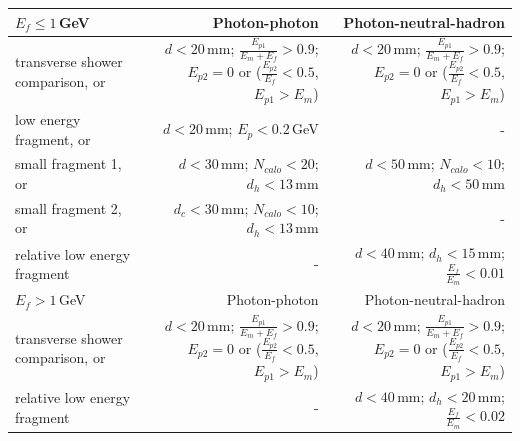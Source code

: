 \begin{table}[htbp]
\centering

\smallskip

\begin{tabular}{l  r  r }
\hline
\hline
$E_f\leqslant1$\,GeV &  Photon-photon & Photon-neutral-hadron \\
\hline
\multicolumn{1}{L{0.3\textwidth}}{transverse shower comparison, or} & \multicolumn{1}{R{0.3\textwidth}}{$d < 20 $\,mm; $\frac{E_{p1}}{E_m + E_f} > 0.9 $; $E_{p2} = 0$ or ($\frac{E_{p2}}{E_f} < 0.5 $, $E_{p1} > E_m$)}  & \multicolumn{1}{R{0.3\textwidth}}{$d < 20 $\,mm; $\frac{E_{p1}}{E_m + E_f} > 0.9 $; $E_{p2} = 0$ or ($\frac{E_{p2}}{E_f} < 0.5 $, $E_{p1} > E_m$)} \\
\multicolumn{1}{L{0.3\textwidth}}{low energy fragment, or} & \multicolumn{1}{R{0.3\textwidth}}{$d < 20 $\,mm; $E_p < 0.2 $\,GeV}  & \multicolumn{1}{R{0.3\textwidth}}{-} \\
\multicolumn{1}{L{0.3\textwidth}}{small fragment 1, or} & \multicolumn{1}{R{0.3\textwidth}}{$d < 30 $\,mm; $N_{calo} < 20 $; $d_h < 13 $\,mm}  & \multicolumn{1}{R{0.3\textwidth}}{$d < 50 $\,mm; $N_{calo} < 10 $; $d_h < 50$\,mm} \\
\multicolumn{1}{L{0.3\textwidth}}{small fragment 2, or} & \multicolumn{1}{R{0.3\textwidth}}{$d_c < 30 $\,mm; $N_{calo} < 10 $; $d_h < 13 $\,mm}  & \multicolumn{1}{R{0.3\textwidth}}{-} \\

\multicolumn{1}{L{0.3\textwidth}}{relative low energy fragment} & \multicolumn{1}{R{0.3\textwidth}}{-}  & \multicolumn{1}{R{0.3\textwidth}}{$d < 40$\,mm; $d_h < 15$\,mm; $\frac{E_{f}}{E_m} < 0.01$} \\
\hline
$E_f>1$\,GeV &  Photon-photon & Photon-neutral-hadron \\
\hline
\multicolumn{1}{L{0.3\textwidth}}{transverse shower comparison, or} & \multicolumn{1}{R{0.3\textwidth}}{$d< 20$\,mm; $\frac{E_{p1}}{E_m + E_f} > 0.9 $; $E_{p2} = 0$ or ($\frac{E_{p2}}{E_f} < 0.5 $, $E_{p1} > E_m$)}  & \multicolumn{1}{R{0.3\textwidth}}{$d< 20$\,mm; $\frac{E_{p1}}{E_m + E_f} > 0.9 $; $E_{p2} = 0$ or ($\frac{E_{p2}}{E_f} < 0.5 $, $E_{p1} > E_m$)} \\
\multicolumn{1}{L{0.3\textwidth}}{relative low energy fragment } & \multicolumn{1}{R{0.3\textwidth}}{-} & \multicolumn{1}{R{0.3\textwidth}}{$d < 40$\,mm; $d_h < 20$\,mm; $\frac{E_f}{E_m} < 0.02$} \\
\hline
\hline
\end{tabular}


\end{table}
